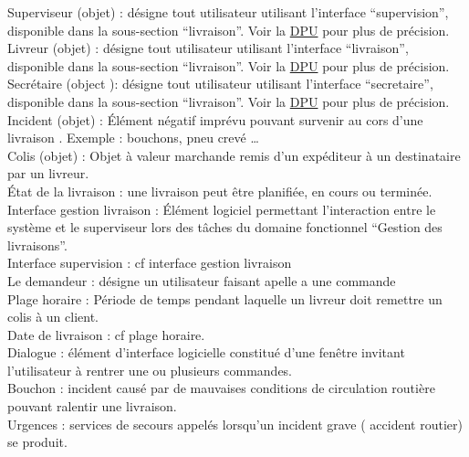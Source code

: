 \documentclass{report}
\begin{document}
\begin{appendices}
Superviseur (objet) : désigne tout utilisateur utilisant l’interface “supervision”, disponible dans la sous-section “livraison”. Voir la \hyperlink{labDPUSup}{DPU} pour plus de précision.\\

Livreur (objet) : désigne tout utilisateur utilisant l’interface “livraison”, disponible dans la sous-section “livraison”. Voir la \hyperlink{labDPULiv}{DPU} pour plus de précision.\\

Secrétaire (object ): désigne tout utilisateur utilisant l’interface “secretaire”, disponible dans la sous-section “livraison”. Voir la \hyperlink{labDPUSec}{DPU} pour plus de précision.\\

Incident (objet) : Élément négatif imprévu pouvant survenir au cors d’une livraison . Exemple : bouchons, pneu crevé …\\

Colis (objet) : Objet à valeur marchande remis d’un expéditeur à un destinataire par un livreur.\\

État de la livraison : une livraison peut être planifiée, en cours ou terminée.\\

Interface gestion livraison : Élément logiciel permettant l’interaction entre le système et le superviseur lors des tâches du domaine fonctionnel “Gestion des livraisons”.\\

Interface supervision : cf interface gestion livraison\\

Le demandeur : désigne un utilisateur faisant apelle a une commande \\

Plage horaire : Période de temps pendant laquelle un livreur doit remettre un colis à un client.\\

Date de livraison : cf plage horaire.\\

Dialogue : élément d’interface logicielle constitué d’une fenêtre invitant l’utilisateur à rentrer une ou plusieurs commandes.\\

Bouchon : incident causé par de mauvaises conditions de circulation routière pouvant ralentir une livraison.\\

Urgences : services de secours appelés lorsqu’un incident grave ( accident routier) se produit.\\


\end{appendices}
\end{document}
